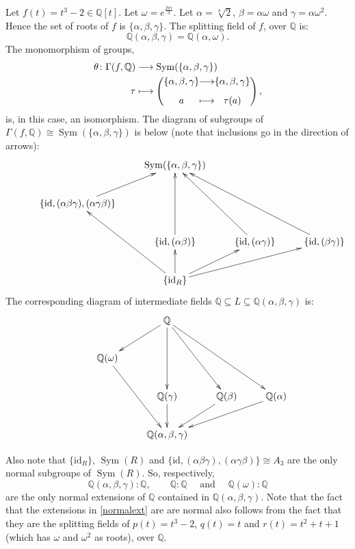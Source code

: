 \documentclass[a4paper,12pt]{article}
\newtheorem{Fundamental Theorem}{Fundamental Theorem}
\DeclareMathOperator{\Sym}{Sym}
\def \id {\mathrm{id}}
\newcommand{\Q}{\mathbb{Q}}
\renewcommand{\a}{{\alpha}}
\renewcommand{\b}{{\beta}}
\def \g {\gamma}
\def \w {\omega}
\begin{document}

 Let $f(t)=t^3-2 \in\Q[t]$. Let $\w=e^{\frac{2\pi i}{3}}$. Let $\a=\sqrt[3]{2}$, $\beta=\a \w$ and $\gamma=\a \w^2$.  Hence the set of roots of $f$ is $\{\a,\b,\g\}$. The splitting field of $f$, over $\Q$ is:
$$\Q(\a,\b,\g)=\Q(\a,\w).$$
The monomorphism of groups,
\begin{align*}
\theta\colon \Gamma(f,\Q) &\longrightarrow \Sym(\{\a,\b,\g\})\\
              \tau & \longmapsto \left( \begin{CD} \{\a,\b,\g\} &\longrightarrow &\{\a,\b,\g\}\\
                                                        a &\longmapsto &\tau(a)
                                        \end{CD}\right),
\end{align*}
is, in this case, an isomorphism.
 The diagram of subgroups of $\Gamma(f,\Q) \cong \Sym(\{\a,\b,\g\})$ is below (note that inclusions go in the direction of arrows):
\[\xymatrix{ && \Sym(\{\a,\b,\gamma\} )\\ & \{\id, (\a\b\g), (\a\g\b)\} \ar[ur] \\ & & \{\id,(\a\b)\}\ar[uu] &\{\id,(\a\g)\}\ar[uul] &\{\id, (\b\g)\}\ar[uull]\\
&& \{\id_R\}\ar[uul]\ar[u] \ar[ur] \ar[urr]
}
\]
The corresponding diagram of intermediate fields $\Q\subseteq L \subseteq \Q(\a,\b,\g)$ is:
\[\xymatrix{ && \Q\\ & \Q(\w) \ar@{<-}[ur] \\ & & \Q(\g)\ar@{<-}[uu] & \Q(\b)\ar@{<-}[uul] & \Q(\a)\ar@{<-}[uull]\\
&&\Q(\a,\b,\g)\ar@{<-}[uul]\ar@{<-}[u] \ar@{<-}[ur] \ar@{<-}[urr]
}
\]

 Also note that $\{\id_R\}$, $\Sym(R)$ and ${\{\id, (\a\b\g), (\a\g\b)\}}\cong A_3$ are the only normal subgroups of $\Sym(R)$. So, respectively,
 \begin{equation}\label{normalext}
 \Q(\a,\b,\g):\Q,\qquad \Q:\Q \quad \textrm{ and } \quad \Q(\w):\Q
 \end{equation}
 are the only normal extensions of $\Q$ contained in $\Q(\a,\b,\g)$.
Note that the fact that the extensions in \eqref{normalext} are
are normal
also follows from the fact that they are the splitting fields of $p(t)=t^3-2$, $q(t)=t$ and $r(t)=t^2+t+1$ (which has $\w$ and $\w^2$ as roots), over $\Q$.
\end{document}
